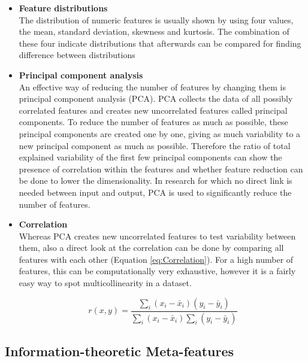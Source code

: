 \documentclass[10pt,a4paper]{article}
\begin{document}
	\begin{itemize}
		\item \textbf{Feature distributions} \\
		The distribution of numeric features is usually shown by using four values, the mean, standard deviation, skewness and kurtosis. The combination of these four indicate distributions that afterwards can be compared for finding difference between distributions
		\item \textbf{Principal component analysis} \\
		An effective way of reducing the number of features by changing them is principal component analysis (PCA). PCA collects the data of all possibly correlated features and creates new uncorrelated features called principal components. To reduce the number of features as much as possible, these principal components are created one by one, giving as much variability to a new principal component as much as possible. Therefore the ratio of total explained variability of the first few principal components can show the presence of correlation within the features and whether feature reduction can be done to lower the dimensionality. In research for which no direct link is needed between input and output, PCA is used to significantly reduce the number of features\cite{wold1987principal}.
		\item \textbf{Correlation} \\
		Whereas PCA creates new uncorrelated features to test variability between them, also a direct look at the correlation can be done by comparing all features with each other\cite{yu2003feature} (Equation \ref{eq:Correlation}). For a high number of features, this can be computationally very exhaustive, however it is a fairly easy way to spot multicollinearity in a dataset\cite{hall2000correlation}.
		
		\begin{equation}\label{eq:Correlation}
		r(x,y) = \frac{\sum_{i}(x_i - \bar{x}_i)(y_i -\bar{y}_i)}{\sum_{i}(x_i - \bar{x}_i)\sum_{i}(y_i -\bar{y}_i)}
		\end{equation}
		
	\end{itemize}
	
	\subsection{Information-theoretic Meta-features}
	\label{subsec:InformationTheoreticMF}
	
\end{document}
